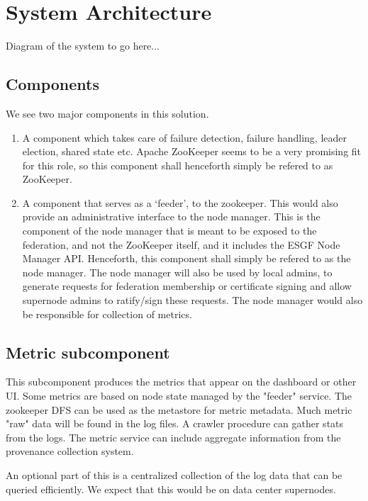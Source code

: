 \documentclass[oneside,12pt]{memoir}
\begin{document}
\section{System Architecture}
Diagram of the system to go here...\\

\subsection{Components}
We see two major components in this solution.
\begin{enumerate}
\item 
A component which takes care of failure detection, failure handling, leader election, shared state etc.
Apache ZooKeeper seems to be a very promising fit for this role, so this component shall henceforth simply be refered to as ZooKeeper.
\item
A component that serves as a `feeder', to the zookeeper. This would also provide an administrative interface to the node manager. This is the component of the node manager that is meant to be exposed to the federation, and not the ZooKeeper itself, and it includes the ESGF Node Manager API. Henceforth, this component shall simply be refered to as the node manager. The node manager will also be used by local admins, to generate requests for federation membership or certificate signing and allow supernode admins to ratify/sign these requests. The node manager would also be responsible for collection of metrics.
\end{enumerate}

\subsection{Metric subcomponent}

This subcomponent produces the metrics that appear on the dashboard or other UI.  Some metrics are based on node state managed by the "feeder" service.  The zookeeper DFS can be used as the metastore for metric metadata.  Much metric "raw" data will be found in the log files.  A crawler procedure can gather stats from the logs.   The metric service can include aggregate information from the provenance collection system. 



An optional part of this is a centralized collection of the log data that can be queried efficiently.  We expect that this would be on data center supernodes.   
\end{document}
